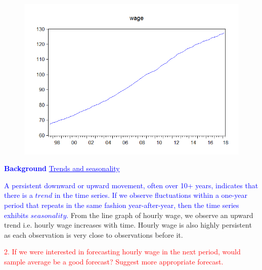 \documentclass[12pt]{report}
\newenvironment{blueframed}[1][blue]
{\def\FrameCommand{\fboxsep=\FrameSep\fcolorbox{#1}{white}}%
\MakeFramed {\advance\hsize-\width \FrameRestore}}
{\endMakeFramed}
\begin{document}
\vspace{-\baselineskip}
\begin{figure}[H]
	\centerline{\includegraphics{wageline}}
\end{figure}
\vspace{-\baselineskip} 
\justify
\begin{blueframed}
	\textcolor{blue}{\textbf{Background}}
	\vspace{-\baselineskip}
	\justify
	\textcolor{blue}{\underline{Trends and seasonality}}
	
	\noindent \textcolor{blue}
	{
		A persistent downward or upward movement, often over 10+ years, indicates that there is a $trend$ in the time series. If we observe fluctuations within a one-year period that repeats in the same fashion year-after-year, then the time series exhibits $seasonality$.
	}
\end{blueframed} \noindent From the line graph of hourly wage, we observe an upward trend i.e. hourly wage increases with time. Hourly wage is also highly persistent as each observation is very close to observations before it.

\noindent \textcolor{red}{2. If we were interested in forecasting hourly wage in the next period, would sample average be a good forecast? Suggest more appropriate forecast.}
\end{document}
